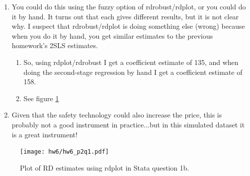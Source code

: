 \documentclass{article}
\begin{document}
\begin{enumerate}
    \item You could do this using the fuzzy option of rdrobust/rdplot, or you could do it by hand.  It turns out that each gives different results, but it is not clear why.  I suspect that rdrobust/rdplot is doing something else (wrong) because when you do it by hand, you get similar estimates to the previous homework's 2SLS estimates.  
    \begin{enumerate}
    \item So, using rdplot/rdrobust I get a coefficient estimate of 135, and when doing the second-stage regression by hand I get a coefficient estimate of 158.
    \item See figure \ref{fig:rdplot}
    \end{enumerate}
    \item Given that the safety technology could also increase the price, this is probably not a good instrument in practice...but in this simulated dataset it is a great instrument!
\end{enumerate}

\begin{figure}
    \centering
    \texttt{[image: hw6/hw6\_p2q1.pdf]}
    \caption{Plot of RD estimates using rdplot in Stata question 1b.}
    \label{fig:rdplot}
\end{figure}
\end{document}
